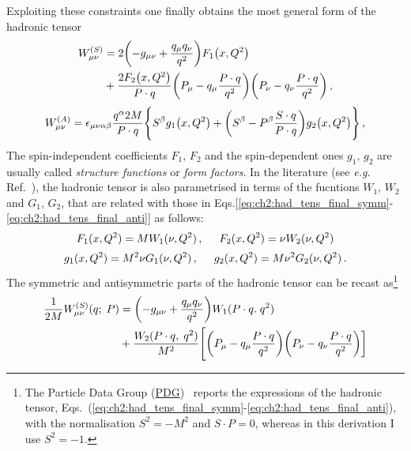 Exploiting these constraints one finally obtains the most general form of the hadronic tensor \cite{collins_2011}
\begin{equation}
  \begin{split}
  W_{\mu \nu}^{(S)} & = 2\qty(-g_{\mu \nu} + \frac{q_{\mu} q_{\nu}}{q^2}) F_1 \qty(x, Q^2) \\
  & + \frac{2 F_2 \qty(x , Q^2) }{P \cdot q} \qty(P_{\mu} - q_{\mu} \frac{P \cdot q}{q^2}) \qty(P_{\nu} - q_{\nu} \frac{P \cdot q}{q^2})\,,
  \label{eq:ch2:had_tens_final_symm}
  \end{split}
\end{equation}
\begin{equation}
  \begin{split}
    W_{\mu \nu}^{(A)}  =  \epsilon_{\mu \nu \alpha \beta} \frac{q^{\alpha}2 M}{P \cdot q} \Biggl\{S^{\beta} g_1 \qty(x, Q^2) + \qty(S^{\beta} - P^{\beta} \frac{S \cdot q}{P \cdot q}) g_2 \qty(x,Q^2) \Biggr\} \,,
    \label{eq:ch2:had_tens_final_anti}
  \end{split}
\end{equation}
The spin-independent coefficients $F_1,\, F_2$ and the spin-dependent ones $g_1,\,g_2$ are usually called \textit{structure functions} or \textit{form factors}. In the literature (see \textit{e.g.} Ref.~\cite{leader_2001,Anselmino:1994gn}), the hadronic tensor is also parametrised in terms of the fucntions $W_1 ,\, W_2$ and $G_1,\, G_2$, that are related with those in Eqs.[\ref{eq:ch2:had_tens_final_symm}-\ref{eq:ch2:had_tens_final_anti}] as follows:
\begin{equation}
  F_1 (x, Q^2) = M W_1 (\nu, Q^2)\,, \hspace{5mm} F_2(x,Q^2) = \nu W_2 (\nu,Q^2)
\end{equation}
\begin{equation}
  g_1 (x, Q^2) = M^2 \nu G_1 (\nu, Q^2) \,, \hspace{5mm} g_2 (x, Q^2) = M \nu^2 G_2 (\nu, Q^2)\,.
\end{equation}
The symmetric and antisymmetric parts of the hadronic tensor can be recast as\footnote{\footnotesize The Particle Data Group (\href{https://pdg.lbl.gov/2019/reviews/rpp2019-rev-structure-functions.pdf}{PDG})~\cite{10.1093/ptep/ptaa104} reports the expressions of the hadronic tensor, Eqs.~(\ref{eq:ch2:had_tens_final_symm}-\ref{eq:ch2:had_tens_final_anti}), with the normalisation $S^2 = - M^2$ and $S \cdot P = 0$, whereas in this derivation I use $S^2 = - 1$.}
\begin{equation}
  \begin{split}
    \frac{1}{2M} W_{\mu \nu}^{(S)} (q; \; P) & = \qty(-g_{\mu \nu} + \frac{q_{\mu} q_{\nu}}{q^2}) W_1( P \cdot q. \; q^2) \\
    & + \frac{W_2 (P\cdot q,\; q^2)}{M^2} \Biggl[ \qty(P_{\mu} - q_{\mu} \frac{P \cdot q}{q^2}) \qty(P_{\nu} - q_{\nu} \frac{P \cdot q}{q^2}) \biggr]
  \end{split}
  \label{eq:ch2:had_tens_symm}
\end{equation}
